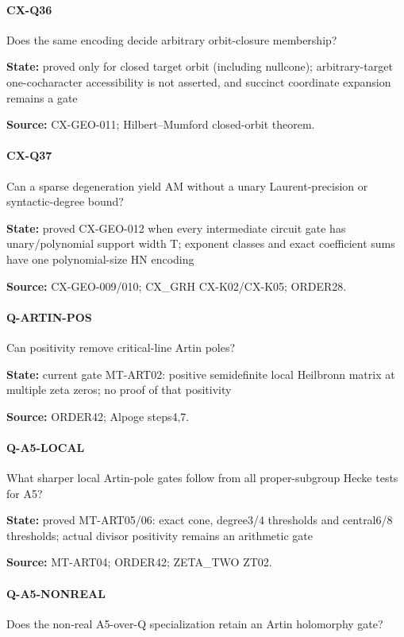 \documentclass[11pt,a4paper]{article}
\begin{document}
\paragraph{CX-Q36} Does the same encoding decide arbitrary orbit-closure membership?

\textbf{State:} proved only for closed target orbit (including nullcone); arbitrary-target one-cocharacter accessibility is not asserted, and succinct coordinate expansion remains a gate

\textbf{Source:} CX-GEO-011; Hilbert–\allowbreak{}Mumford closed-orbit theorem.

\paragraph{CX-Q37} Can a sparse degeneration yield AM without a unary Laurent-precision or syntactic-degree bound?

\textbf{State:} proved CX-GEO-012 when every intermediate circuit gate has unary/\allowbreak{}polynomial support width T; exponent classes and exact coefficient sums have one polynomial-size HN encoding

\textbf{Source:} CX-GEO-009/\allowbreak{}010; CX\_\allowbreak{}GRH CX-K02/\allowbreak{}CX-K05; ORDER28.

\paragraph{Q-ARTIN-POS} Can positivity remove critical-line Artin poles?

\textbf{State:} current gate MT-ART02:\allowbreak{} positive semidefinite local Heilbronn matrix at multiple zeta zeros; no proof of that positivity

\textbf{Source:} ORDER42; Alpoge steps4,7.

\paragraph{Q-A5-LOCAL} What sharper local Artin-pole gates follow from all proper-subgroup Hecke tests for A5?

\textbf{State:} proved MT-ART05/\allowbreak{}06:\allowbreak{} exact cone, degree3/\allowbreak{}4 thresholds and central6/\allowbreak{}8 thresholds; actual divisor positivity remains an arithmetic gate

\textbf{Source:} MT-ART04; ORDER42; ZETA\_\allowbreak{}TWO ZT02.

\paragraph{Q-A5-NONREAL} Does the non-real A5-over-Q specialization retain an Artin holomorphy gate?
\end{document}

